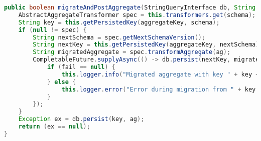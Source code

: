 \begin{lstlisting}[language=Java, caption={Metode for håndtering av POST-spørring i Migrator.}]
public boolean migrateAndPostAggregate(StringQueryInterface db, String aggregateKey, String schema, String ag) {
    AbstractAggregateTransformer spec = this.transformers.get(schema);
    String key = this.getPersistedKey(aggregateKey, schema);
    if (null != spec) {
        String nextSchema = spec.getNextSchemaVersion();
        String nextKey = this.getPersistedKey(aggregateKey, nextSchema);
        String migratedAggregate = spec.transformAggregate(ag);
        CompletableFuture.supplyAsync(() -> db.persist(nextKey, migratedAggregate)).thenAcceptAsync((fail) -> {
            if (fail == null) {
                this.logger.info("Migrated aggregate with key " + key + " to " + nextKey);
            } else {
                this.logger.error("Error during migration from " + key + " to " + nextKey + ":\n"+ fail.toString());
            }
        });
    }
    Exception ex = db.persist(key, ag);
    return (ex == null);
}
\end{lstlisting}
